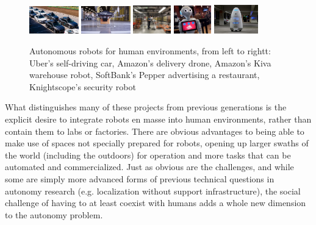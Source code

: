 \documentclass{sfuthesis}
\begin{document}
\begin{figure}[!b]
    \centering
    \includegraphics[width=0.19\textwidth]{uber.jpg} 
    \hspace{-0.25cm}
        \includegraphics[width=0.19\textwidth]{amazon_delivery.jpg} 
    \hspace{-0.25cm}
        \includegraphics[width=0.145\textwidth]{kiva.jpg} 
    \hspace{-0.25cm}
        \includegraphics[width=0.145\textwidth]{Pepper.jpg} 
    \hspace{-0.25cm}
    \includegraphics[width=0.17\textwidth]{knightscope.jpg} 
    \hspace{-0.25cm}

    \caption{Autonomous robots for human environments, from left to rightt: Uber's self-driving car, Amazon's delivery drone, Amazon's Kiva warehouse robot, SoftBank's Pepper advertising a restaurant, Knightscope's security robot}
    \label{fig:robots}
\end{figure}

What distinguishes many of these projects from previous generations is the explicit desire to integrate robots en masse into human environments, rather than contain them to labs or factories. There are obvious advantages to being able to make use of spaces not specially prepared for robots, opening up larger swaths of the world (including the outdoors) for operation and more tasks that can be automated and commercialized. Just as obvious are the challenges, and while some are simply more advanced forms of previous technical questions in autonomy research (e.g. localization without support infrastructure), the social challenge of having to at least coexist with humans adds a whole new dimension to the autonomy problem.
\end{document}
